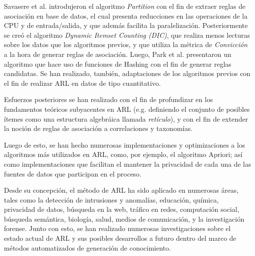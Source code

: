 Savasere et al. introdujeron el algoritmo \textit{Partition}\cite{savasere1995efficient} con el fin de extraer reglas de asociación en base de datos, el cual presenta reducciones en las operaciones de la CPU y de entrada/salida, y que además facilita la paralelización. Posteriormente se creó el algoritmo \textit{Dynamic Itemset Counting (DIC)}\cite{brin1997dynamic}, que realiza menos lecturas sobre los datos que los algoritmos previos, y que utiliza la métrica de \textit{Convicción} a la hora de generar reglas de asociación. Luego, Park et al. presentaron un algoritmo que hace uso de funciones de Hashing con el fin de generar reglas candidatas\cite{park1995effective}. Se han realizado, también, adaptaciones de los algoritmos previos con el fin de realizar ARL en datos de tipo cuantitativo\cite{srikant1996mining}.

Esfuerzos posteriores se han realizado con el fin de profundizar en los fundamentos teóricos subyacentes en ARL (e.g. definiendo el conjunto de posibles ítemes como una estructura algebráica llamada \textit{retículo})\cite{zaki1998theoretical}, y con el fin de extender la noción de reglas de asociación a correlaciones\cite{brin1997beyond} y taxonomías\cite{srikant1996mining}.

Luego de esto, se han hecho numerosas implementaciones y optimizaciones a los algoritmos más utilizados en ARL, como, por ejemplo, el algoritmo Apriori\cite{bodon2010fast}; así como implementaciones que facilitan el mantener la privacidad de cada una de las fuentes de datos que participan en el proceso\cite{evfimievski2004privacy}.

Desde su concepción, el método de ARL ha sido aplicado en numerosas áreas, tales como la detección de intrusiones\cite{lee2000framework} y anomalías\cite{patcha2007overview}\cite{chandola2009anomaly}, educación\cite{romero2007educational}\cite{romero2008data}, química\cite{dehaspe1998finding}, privacidad de datos\cite{ghinita2008private}, búsqueda en la web\cite{ferragina2008personalized}, tráfico en redes\cite{estan2003automatically}, computación social\cite{li2008tag}, búsqueda semántica\cite{cohen2007associative}, biología\cite{kramer2001molecular}\cite{carmona2007genecodis}, salud\cite{karabatak2009expert}\cite{chaves2011efficient}, medios de comunicación\cite{davidson2010youtube}\cite{kobilarov2009media}, y la investigación forense\cite{iqbal2013unified}. Junto con esto, se han realizado numerosas investigaciones sobre el estado actual de ARL y sus posibles desarrollos a futuro dentro del marco de métodos automatizados de generación de conocimiento\cite{han2007frequent}.

